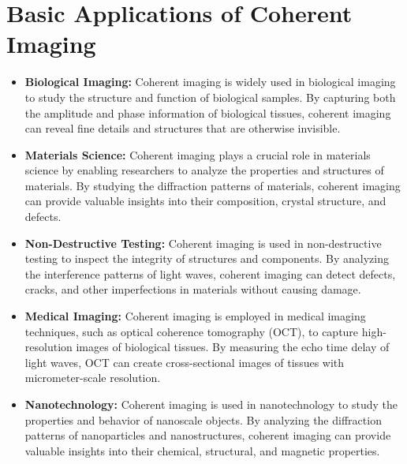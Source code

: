 \documentclass[12pt, a4paper, twocolumn]{article}
\begin{document}
\section{Basic Applications of Coherent Imaging}
	\begin{itemize}
		\item \textbf{Biological Imaging:} Coherent imaging is widely used in biological imaging to study the structure and function of biological samples. By capturing both the amplitude and phase information of biological tissues, coherent imaging can reveal fine details and structures that are otherwise invisible.
		\item \textbf{Materials Science:} Coherent imaging plays a crucial role in materials science by enabling researchers to analyze the properties and structures of materials. By studying the diffraction patterns of materials, coherent imaging can provide valuable insights into their composition, crystal structure, and defects.
		\item \textbf{Non-Destructive Testing:} Coherent imaging is used in non-destructive testing to inspect the integrity of structures and components. By analyzing the interference patterns of light waves, coherent imaging can detect defects, cracks, and other imperfections in materials without causing damage.
		\item \textbf{Medical Imaging:} Coherent imaging is employed in medical imaging techniques, such as optical coherence tomography (OCT), to capture high-resolution images of biological tissues. By measuring the echo time delay of light waves, OCT can create cross-sectional images of tissues with micrometer-scale resolution.
		\item \textbf{Nanotechnology:} Coherent imaging is used in nanotechnology to study the properties and behavior of nanoscale objects. By analyzing the diffraction patterns of nanoparticles and nanostructures, coherent imaging can provide valuable insights into their chemical, structural, and magnetic properties.
	\end{itemize}
\end{document}
